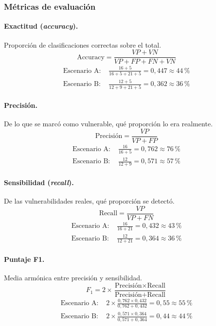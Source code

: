 \documentclass[11pt,letterpaper]{article}
\begin{document}
\subsubsection{Métricas de evaluación}

\paragraph{Exactitud (\textit{accuracy}).} Proporción de clasificaciones correctas sobre el total.
\[
\text{Accuracy}=\frac{VP+VN}{VP+FP+FN+VN}
\]
\begin{align*}
\text{Escenario A: } & \frac{16+5}{16+5+21+5}=0{,}447\approx 44\,\% \\
\text{Escenario B: } & \frac{12+5}{12+9+21+5}=0{,}362\approx 36\,\%
\end{align*}

\paragraph{Precisión.} De lo que se marcó como vulnerable, qué proporción lo era realmente.
\[
\text{Precisión}=\frac{VP}{VP+FP}
\]
\begin{align*}
\text{Escenario A: } & \frac{16}{16+5}=0{,}762\approx 76\,\% \\
\text{Escenario B: } & \frac{12}{12+9}=0{,}571\approx 57\,\%
\end{align*}

\paragraph{Sensibilidad (\textit{recall}).} De las vulnerabilidades reales, qué proporción se detectó.
\[
\text{Recall}=\frac{VP}{VP+FN}
\]
\begin{align*}
\text{Escenario A: } & \frac{16}{16+21}=0{,}432\approx 43\,\% \\
\text{Escenario B: } & \frac{12}{12+21}=0{,}364\approx 36\,\%
\end{align*}

\paragraph{Puntaje F1.} Media armónica entre precisión y sensibilidad.
\[
F_1=2\times\frac{\text{Precisión}\times\text{Recall}}{\text{Precisión}+\text{Recall}}
\]
\begin{align*}
\text{Escenario A: } & 2\times\frac{0{,}762\times 0{,}432}{0{,}762+0{,}432}=0{,}55\approx 55\,\% \\
\text{Escenario B: } & 2\times\frac{0{,}571\times 0{,}364}{0{,}571+0{,}364}=0{,}44\approx 44\,\%
\end{align*}
\end{document}
